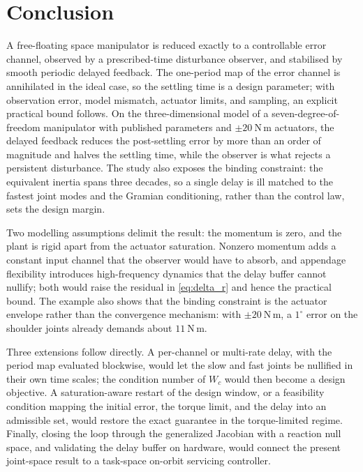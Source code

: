 \section{Conclusion}\label{sec:conclusion}
A free-floating space manipulator is reduced exactly to a controllable error
channel, observed by a prescribed-time disturbance observer, and stabilised by
smooth periodic delayed feedback. The one-period map of the error channel is
annihilated in the ideal case, so the settling time is a design parameter; with
observation error, model mismatch, actuator limits, and sampling, an explicit
practical bound follows. On the three-dimensional model of a
seven-degree-of-freedom manipulator with published parameters and
$\pm20~\mathrm{N\,m}$ actuators, the delayed feedback reduces the post-settling
error by more than an order of magnitude and halves the settling time, while
the observer is what rejects a persistent disturbance. The study also exposes
the binding constraint: the equivalent inertia spans three decades, so a single
delay is ill matched to the fastest joint modes and the Gramian conditioning,
rather than the control law, sets the design margin.

Two modelling assumptions delimit the result: the momentum is zero, and the
plant is rigid apart from the actuator saturation. Nonzero momentum adds a
constant input channel that the observer would have to absorb, and appendage
flexibility introduces high-frequency dynamics that the delay buffer cannot
nullify; both would raise the residual in \eqref{eq:delta_r} and hence the
practical bound. The example also shows that the binding constraint is the
actuator envelope rather than the convergence mechanism: with
$\pm20~\mathrm{N\,m}$, a $1^\circ$ error on the shoulder joints already demands
about $11~\mathrm{N\,m}$.

Three extensions follow directly. A per-channel or multi-rate delay, with the
period map evaluated blockwise, would let the slow and fast joints be nullified
in their own time scales; the condition number of $W_c$ would then become a
design objective. A saturation-aware restart of the design window, or a
feasibility condition mapping the initial error, the torque limit, and the
delay into an admissible set, would restore the exact guarantee in the
torque-limited regime. Finally, closing the loop through the generalized
Jacobian with a reaction null space, and validating the delay buffer on
hardware, would connect the present joint-space result to a task-space
on-orbit servicing controller.

